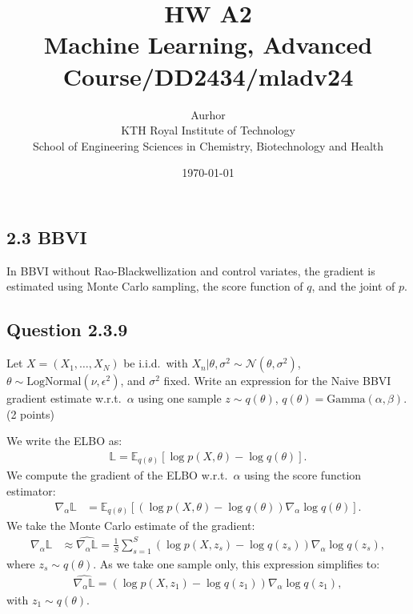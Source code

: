 \documentclass{article}
\title{HW A2\\\Large{Machine Learning, Advanced Course/DD2434/mladv24}}
\author{Aurhor \\ KTH Royal Institute of Technology\\ School of Engineering Sciences in Chemistry, Biotechnology and Health}
\date{\today}
\begin{document}
\maketitle

\fancyfoot[C]{\thepage}
\begin{multicols}{2}



\section*{2.3 BBVI}
In BBVI without Rao-Blackwellization and control variates, the gradient is estimated using Monte Carlo sampling, the score function of \(q\), and the joint of \(p\).

\subsection*{Question 2.3.9}
Let \(X = (X_1, \dots, X_N)\) be i.i.d.\ with \(X_n | \theta, \sigma^2 \sim \mathcal{N}(\theta, \sigma^2)\), \(\theta \sim \text{LogNormal}(\nu, \epsilon^2)\), and \(\sigma^2\) fixed. Write an expression for the Naive BBVI gradient estimate w.r.t.\ \(\alpha\) using one sample \(z \sim q(\theta)\), \(q(\theta) = \text{Gamma}(\alpha, \beta)\). (2 points)\bigskip 

We write the ELBO as:
\begin{align*}
    \mathbb{L} = \mathbb{E}_{q(\theta)}\left[\log p(X, \theta) - \log q(\theta)\right].
\end{align*}
We compute the gradient of the ELBO w.r.t.\ \(\alpha\) using the score function estimator:
\begin{align*}
    \nabla_\alpha \mathbb{L} &= \mathbb{E}_{q(\theta)}\left[(\log p(X, \theta) - \log q(\theta)) \nabla_\alpha \log q(\theta) \right].
\end{align*}
We take the Monte Carlo estimate of the gradient:
\begin{align*}
    \nabla_\alpha \mathbb{L} &\approx \widehat{\nabla_\alpha \mathbb{L}} = \frac{1}{S}\sum_{s=1}^{S}(\log p(X, z_s) - \log q(z_s)) \nabla_\alpha \log q(z_s),
\end{align*}
where \(z_s \sim q(\theta)\). As we take one sample only, this expression simplifies to:
\begin{align*}
    \widehat{\nabla_\alpha \mathbb{L}} = (\log p(X, z_1) - \log q(z_1)) \nabla_\alpha \log q(z_1),
\end{align*}
with \(z_1 \sim q(\theta)\).


\end{multicols}
\end{document}
